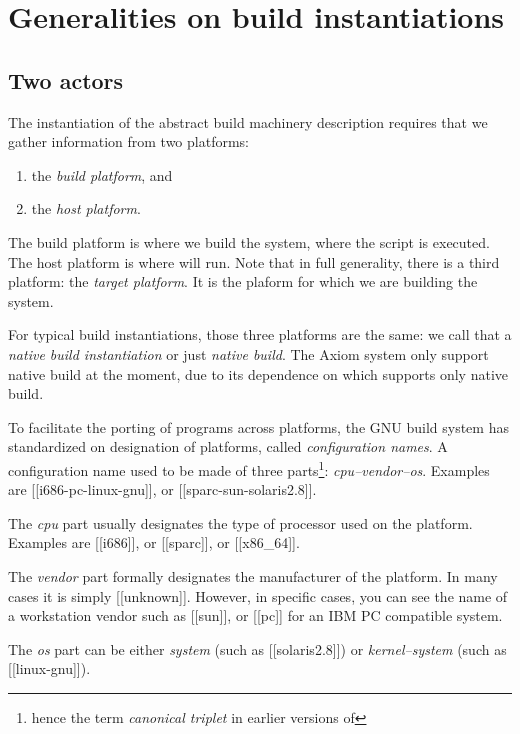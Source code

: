 \documentclass[12pt]{article}
\begin{document}
\section{Generalities on build instantiations}

\subsection{Two actors}

The instantiation of the abstract build machinery description requires
that we gather information from two platforms:
\begin{enumerate}
\item the \emph{build platform}, and
\item the \emph{host platform}.
\end{enumerate}

The build platform is where we build the system, \eg{} where
the  script is executed.  The host platform
is where  will run.  Note that in full generality, there is
a third platform: the \emph{target platform}.  It is the plaform for which
we are building the system.

For typical build instantiations, those  three  platforms are the same: we
call that a \emph{native build instantiation} or just \emph{native build}.
The Axiom system only support native build at the moment, due to its
dependence on  which supports only native build.

To facilitate the porting of programs across platforms, the GNU build
system has standardized on designation of platforms, called
\emph{configuration names}.  A configuration name used to be
made of three parts\footnote{hence the term \emph{canonical triplet} in
    earlier versions of }:
\textsl{cpu--vendor--os}.  Examples are
[[i686-pc-linux-gnu]], or [[sparc-sun-solaris2.8]].

The \textsl{cpu}
part usually designates the type of processor used on the platform.
Examples are [[i686]], or [[sparc]], or [[x86_64]].

The \textsl{vendor} part formally designates the manufacturer of
the platform.  In many cases it is simply [[unknown]].  However,
in specific cases, you can see the name of a workstation vendor such
as [[sun]], or [[pc]] for an IBM PC compatible system.

The \textsl{os} part can be either \textsl{system} (such as [[solaris2.8]])
or \textsl{kernel--system} (such as [[linux-gnu]]).
\end{document}
